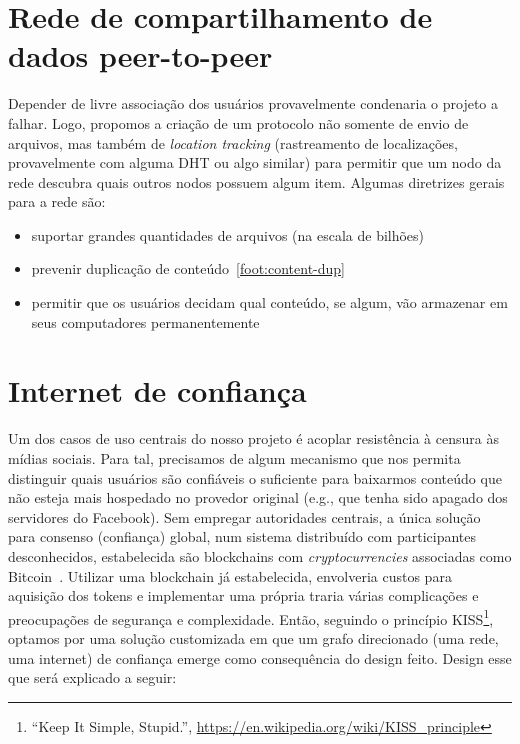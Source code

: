 \section{Rede de compartilhamento de dados peer-to-peer}

Depender de livre associação dos usuários provavelmente condenaria o projeto a falhar.
Logo, propomos a criação de um protocolo não somente de envio de arquivos, mas também de \textit{location tracking} (rastreamento de localizações, provavelmente com alguma DHT ou algo similar) para permitir que um nodo da rede descubra quais outros nodos possuem algum item.
Algumas diretrizes gerais para a rede são:
\begin{itemize}
    \item suportar grandes quantidades de arquivos (na escala de bilhões)
    \item prevenir duplicação de conteúdo~\ref{foot:content-dup}
    \item permitir que os usuários decidam qual conteúdo, se algum, vão armazenar em seus computadores permanentemente
\end{itemize}

\section{Internet de confiança}

Um dos casos de uso centrais do nosso projeto é acoplar resistência à censura às mídias sociais.
Para tal, precisamos de algum mecanismo que nos permita distinguir quais usuários são confiáveis o suficiente para baixarmos conteúdo que não esteja mais hospedado no provedor original (e.g., que tenha sido apagado dos servidores do Facebook).
Sem empregar autoridades centrais, a única solução para consenso (confiança) global, num sistema distribuído com participantes desconhecidos, estabelecida são blockchains com \textit{cryptocurrencies} associadas como Bitcoin~\cite{nakamoto2008bitcoin}.
Utilizar uma blockchain já estabelecida, envolveria custos para aquisição dos tokens e implementar uma própria traria várias complicações e preocupações de segurança e complexidade.
Então, seguindo o princípio KISS\footnote{``Keep It Simple, Stupid.'', \url{https://en.wikipedia.org/wiki/KISS_principle}}, optamos por uma solução customizada em que um grafo direcionado (uma rede, uma internet) de confiança emerge como consequência do design feito.
Design esse que será explicado a seguir:

